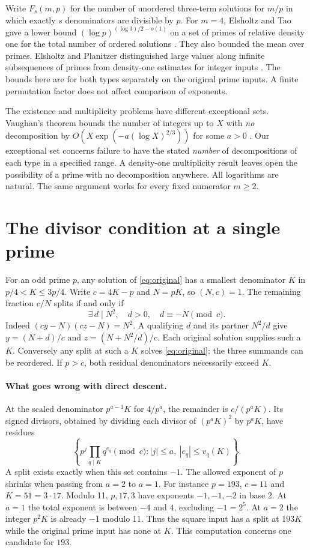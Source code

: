 \documentclass[a4paper,11pt]{article}
\begin{document}
Write $F_s(m,p)$ for the number of unordered three-term solutions for $m/p$ in which exactly $s$ denominators are divisible by $p$. For $m=4$, Elsholtz and Tao gave a lower bound $(\log p)^{(\log3)/2-o(1)}$ on a set of primes of relative density one for the total number of ordered solutions \cite[Theorem 1.8]{et}. They also bounded the mean over primes. Elsholtz and Planitzer distinguished large values along infinite subsequences of primes from density-one estimates for integer inputs \cite{ep}. The bounds here are for both types separately on the original prime inputs. A finite permutation factor does not affect comparison of exponents.

The existence and multiplicity problems have different exceptional sets. Vaughan's theorem bounds the number of integers up to $X$ with \emph{no} decomposition by $O(X\exp(-a(\log X)^{2/3}))$ for some $a>0$ \cite{vaughan,pw}. Our exceptional set concerns failure to have the stated \emph{number} of decompositions of each type in a specified range. A density-one multiplicity result leaves open the possibility of a prime with no decomposition anywhere. All logarithms are natural. The same argument works for every fixed numerator $m\ge2$.



\section{The divisor condition at a single prime}\label{sec:point}
For an odd prime $p$, any solution of \eqref{eq:original} has a smallest denominator $K$ in $p/4<K\le3p/4$. Write $c=4K-p$ and $N=pK$, so $(N,c)=1$. The remaining fraction $c/N$ splits if and only if
\begin{equation}\label{eq:exact}
 \exists\,d\mid N^2,\quad d>0,\quad d\equiv-N\pmod c .
\end{equation}
Indeed $(cy-N)(cz-N)=N^2$. A qualifying $d$ and its partner $N^2/d$ give $y=(N+d)/c$ and $z=(N+N^2/d)/c$. Each original solution supplies such a $K$. Conversely any split at such a $K$ solves \eqref{eq:original}; the three summands can be reordered. If $p>c$, both residual denominators necessarily exceed $K$.

\paragraph{What goes wrong with direct descent.}
At the scaled denominator $p^{a-1}K$ for $4/p^a$, the remainder is $c/(p^aK)$. Its signed divisors, obtained by dividing each divisor of $(p^aK)^2$ by $p^aK$, have residues
\[
 \left\{p^j\prod_{q\mid K}q^{e_q}\pmod c:
       |j|\le a,\ |e_q|\le v_q(K)\right\}.
\]
A split exists exactly when this set contains $-1$. The allowed exponent of $p$ shrinks when passing from $a=2$ to $a=1$. For instance $p=193$, $c=11$ and $K=51=3\cdot17$. Modulo 11, $p,17,3$ have exponents $-1,-1,-2$ in base 2. At $a=1$ the total exponent is between $-4$ and $4$, excluding $-1=2^5$. At $a=2$ the integer $p^2K$ is already $-1$ modulo 11. Thus the square input has a split at $193K$ while the original prime input has none at $K$. This computation concerns one candidate for $193$.
\end{document}
